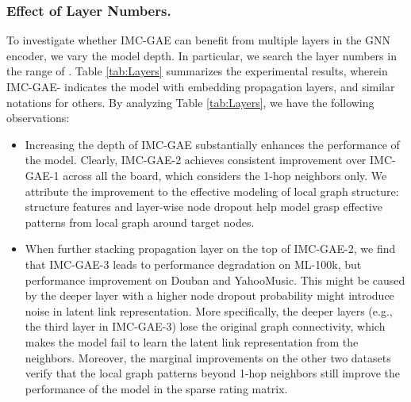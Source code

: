 \documentclass[sigconf]{acmart}
\begin{document}
\subsubsection{Effect of Layer Numbers.} To investigate whether IMC-GAE can benefit from multiple layers in the GNN encoder, we vary the model depth. In particular, we search the layer numbers in the range of . Table \ref{tab:Layers} summarizes the experimental results, wherein IMC-GAE- indicates the model with  embedding propagation layers, and similar notations for others. By analyzing Table 
\ref{tab:Layers}, we have the following observations:
\begin{itemize}[leftmargin=*]
    \item Increasing the depth of IMC-GAE substantially enhances the performance of the model. Clearly, IMC-GAE-2 achieves consistent improvement over IMC-GAE-1 across all the board, which considers the 1-hop neighbors only. We attribute the improvement to the effective modeling of local graph structure: structure features and layer-wise node dropout help model grasp effective patterns from local graph around target nodes.
    \item When further stacking propagation layer on the top of IMC-GAE-2, we find that IMC-GAE-3 leads to performance degradation on ML-100k, but performance improvement on Douban and YahooMusic. This might be caused by the deeper layer with a higher node dropout probability might introduce noise in latent link representation. More specifically, the deeper layers (e.g., the third layer in IMC-GAE-3) lose the original graph connectivity, which makes the model fail to learn the latent link representation from the neighbors. Moreover, the marginal improvements on the other two datasets verify that the local graph patterns beyond 1-hop neighbors still improve the performance of the model in the sparse rating matrix.   
\end{itemize}
\end{document}
